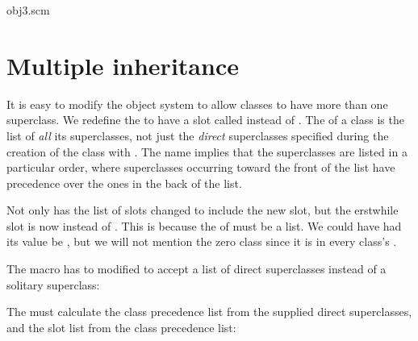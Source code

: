 \scmfilename obj3.scm



\section{Multiple inheritance}

It is easy to modify the object system to allow classes
to have more than one superclass.  We redefine the
  to have a slot called
 instead of .
The  of a class is the list of
{\em all} its superclasses, not just the {\em direct}
superclasses specified during the creation of the class
with .  The name implies that the
superclasses are listed in a particular order, where
superclasses occurring toward the front of the list
have precedence over the ones in the back of the list.



\n Not only has the list of slots changed to include
the new slot, but the erstwhile  slot is
now \q{()} instead of .  This is because the
 of  must be
a list.  We could have had its value be , but
we will not mention the zero class since it is in every
class’s .

The  macro has to modified to accept
a list of direct superclasses instead of a solitary superclass:


The  must calculate the class precedence list from
the supplied direct superclasses, and the slot list from the
class precedence list:

